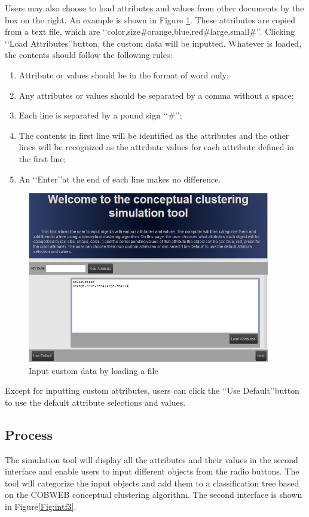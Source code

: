 Users may also choose to load attributes and values from other documents by the box on the right. An example is shown in Figure \ref{Fig:intf2_loadfile}. These attributes are copied from a text file, which are  \lq\lq{color,size\#orange,blue,red\#large,small\#}\rq\rq. Clicking \lq\lq{Load Attributes}\rq\rq button, the custom data will be inputted. Whatever is loaded, the contents should follow the following rules:
\begin{enumerate}\renewcommand{\labelenumi}{(\theenumi)}\setlength{\itemsep}{0.05pt}
\item Attribute or values should be in the format of word only; 
\item Any attributes or values should be separated by a comma without a space;
\item Each line is separated by a pound sign \lq\lq{\#}\rq\rq;
\item The contents in first line will be identified as the attributes and the other lines will be recognized as the attribute values for each attribute defined in the first line;
\item An \lq\lq{Enter}\rq\rq at the end of each line makes no difference.
\end{enumerate}  
 \begin{figure}[h!]
       \centering
       \includegraphics[width=300pt]{../images/interface2_loadfile.jpg}
       \caption{Input custom data by loading a file}
       \label{Fig:intf2_loadfile}
 \end{figure}  
 
Except for inputting custom attributes, users can click the \lq\lq{Use Default}\rq\rq button to use the default attribute selections and values. 	

\subsection {Process}
The simulation tool will display all the attributes and their values in the second interface and enable users to input different objects from the radio buttons. The tool will categorize the input objects and add them to a classification tree based on the COBWEB conceptual clustering algorithm. The second interface is shown in Figure\ref{Fig:intf3}. 
    
